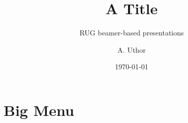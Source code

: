 \documentclass[%
  10pt,%
]{../templates/pres_template/cognigronbeamer}
\date{\today}
\title{A Title}
\subtitle{RUG beamer-based presentations}
\author{A. Uthor}
\institute{University of Groningen\\ Faculty of Science and Engineering}
\begin{document}
{
\begin{frame}%
\titlepage
\end{frame}
}

\section{Big Menu}










\end{document}

